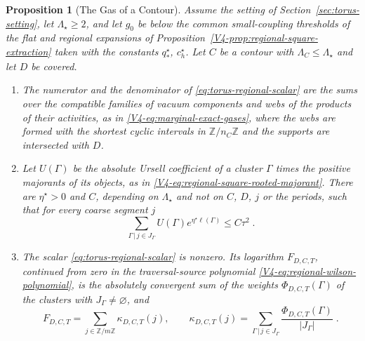 \documentclass[11pt]{article}
\numberwithin{equation}{section}
\newtheorem{proposition}[theorem]{Proposition}
\theoremstyle{remark}
\theoremstyle{plain}
\begin{document}
\begin{proposition}[The Gas of a Contour]\label{prop:torus-gas}
Assume the setting of Section~\ref{sec:torus-setting}, let $\Lambda_{\star}\geqslant 2$, and let $g_0$ be below the common small-coupling thresholds of the flat and regional expansions of Proposition~\ref{V4-prop:regional-square-extraction} taken with the constants $q_*^{\star}$, $c_h^{\star}$. Let $C$ be a contour with $\Lambda_C\leqslant \Lambda_{\star}$ and let $D$ be covered.
\begin{enumerate}[label=(\roman*)]
    \item The numerator and the denominator of \eqref{eq:torus-regional-scalar} are the sums over the compatible families of vacuum components and webs of the products of their activities, as in \eqref{V4-eq:marginal-exact-gases}, where the webs are formed with the shortest cyclic intervals in $\mathbb Z/n_C\mathbb Z$ and the supports are intersected with $D$.
    \item Let $U(\Gamma)$ be the absolute Ursell coefficient of a cluster $\Gamma$ times the positive majorants of its objects, as in \eqref{V4-eq:regional-square-rooted-majorant}. There are $\eta^{\star}>0$ and $C$, depending on $\Lambda_{\star}$ and not on $C$, $D$, $j$ or the periods, such that for every coarse segment $j$
    \begin{equation}\label{eq:torus-rooted-majorant}
        \sum_{\Gamma\, | \,j\in J_{\Gamma}}U(\Gamma)e^{\eta^{\star}\ell(\Gamma)}\leqslant C\tau^2\;.
    \end{equation}
    \item The scalar \eqref{eq:torus-regional-scalar} is nonzero. Its logarithm $F_{D,C,T}$, continued from zero in the traversal-source polynomial \eqref{V4-eq:regional-wilson-polynomial}, is the absolutely convergent sum of the weights $\Phi_{D,C,T}(\Gamma)$ of the clusters with $J_{\Gamma}\neq\varnothing$, and
    \begin{equation}\label{eq:torus-allocation}
        F_{D,C,T}=\sum_{j\in\mathbb Z/m\mathbb Z}\kappa_{D,C,T}(j),
        \qquad
        \kappa_{D,C,T}(j)=\sum_{\Gamma\, | \,j\in J_{\Gamma}}\frac{\Phi_{D,C,T}(\Gamma)}{| J_{\Gamma}|}\;.
    \end{equation}
\end{enumerate}
\end{proposition}
\end{document}
